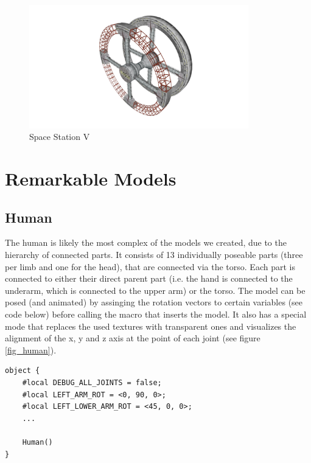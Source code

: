 \begin{figure}[ht]
	\centering
	\includegraphics[width=0.85\textwidth]{images/station.jpg}
	\caption{Space Station V}
	\label{station}
\end{figure}

\section{Remarkable Models}

\subsection{Human} \label{human_model}

The human is likely the most complex of the models we created, due to the hierarchy of connected parts.
It consists of 13 individually poseable parts (three per limb and one for the head), that are connected via the torso.
Each part is connected to either their direct parent part (i.e. the hand is connected to the underarm, which is connected to the upper arm) or the torso.
The model can be posed (and animated) by assinging the rotation vectors to certain variables (see code below) before calling the macro that inserts the model. 
It also has a special mode that replaces the used textures with transparent ones and visualizes the alignment of the x, y and z axis at the point of each joint (see figure \ref{fig_human}).

\begin{lstlisting}
object {
    #local DEBUG_ALL_JOINTS = false;
    #local LEFT_ARM_ROT = <0, 90, 0>;
    #local LEFT_LOWER_ARM_ROT = <45, 0, 0>;
    ...

    Human()
}
\end{lstlisting}

